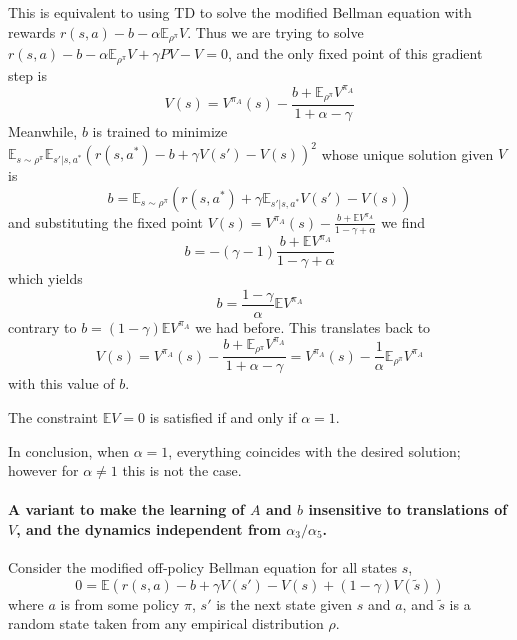 \documentclass[11pt]{article}
\newcommand{\E}{\mathbb{E}}
\begin{document}
This is equivalent to using TD
to solve the modified Bellman equation with
rewards $r(s,a)-b-\alpha \E_{\rho^\pi}V$. Thus we are trying to solve
$r(s,a)-b-\alpha \E_{\rho^\pi}V+\gamma PV-V=0$, and the only fixed point
of this gradient step is
\begin{equation}
V(s)=V^{\pi_A}(s)-\frac{b+\E_{\rho^\pi} V^{\pi_A}}{1+\alpha-\gamma}
\end{equation}
Meanwhile, $b$ is trained to minimize $\E_{s\sim
\rho^\pi}\E_{s'|s,a^\ast}
(r(s,a^\ast)-b+\gamma V(s')-V(s))^2$ whose unique
solution given $V$ is 
\begin{equation}
b=\E_{s\sim \rho^\pi}(r(s,a^\ast)+\gamma \E_{s'|s,a^\ast}V(s')-V(s))
\end{equation}
and substituting the fixed point
$V(s)=V^{\pi_A}(s)-\frac{b+\E V^{\pi_A}}{1-\gamma+\alpha}$ we find
\begin{equation}
b=-(\gamma-1) \frac{b+\E V^{\pi_A}}{1-\gamma+\alpha}
\end{equation}
which yields
\begin{equation}
b=\frac{1-\gamma}{\alpha} \E V^{\pi_A}
\end{equation}
contrary to $b=(1-\gamma)\E V^{\pi_A}$ we had before. 
This translates back to
\begin{equation}
V(s)=V^{\pi_A}(s)-\frac{b+\E_{\rho^\pi} V^{\pi_A}}{1+\alpha-\gamma}
=V^{\pi_A}(s)-\frac1\alpha \E_{\rho^\pi} V^{\pi_A}
\end{equation}
with this value of $b$.

The constraint $\E V=0$ is satisfied if and only if $\alpha=1$.

In conclusion, when $\alpha=1$, everything coincides with the desired
solution; however for $\alpha\neq 1$ this is not the case.

\paragraph{A variant to make the learning of $A$ and $b$ insensitive to
translations of $V$, and the dynamics independent from
$\alpha_3/\alpha_5$.} Consider the modified off-policy Bellman equation
for all states $s$,
\begin{equation}
0=\E \left(
r(s,a)-b+\gamma V(s')-V(s)+(1-\gamma)V(\tilde s)
\right)
\end{equation}
where $a$ is from some policy $\pi$, $s'$ is the next state given $s$ and
$a$, and $\tilde s$ is a random state taken from any empirical
distribution $\rho$.
\end{document}
